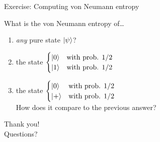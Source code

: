 \documentclass[10pt,aspectratio=169]{beamer}
\begin{document}
\begin{frame}{Exercise: Computing von Neumann entropy}
  \begin{exampleblock}{What is the von Neumann entropy of\dots}
    \begin{enumerate}[<+->]
      \item \emph{any} pure state $\ket{\psi}$?
      \item the state
        $\begin{cases}\ket{0} & \text{with prob. }1/2 \\ \ket{1} & \text{with prob. }1/2\end{cases}$
      \item the state
        $\begin{cases}\ket{0} & \text{with prob. }1/2 \\ \ket{+} & \text{with prob. }1/2\end{cases}$
        \\[0.4em]
        How does it compare to the previous answer?
    \end{enumerate}
  \end{exampleblock}
\end{frame}

\begin{frame}[plain]
  \centering
  \vfill
  {\Huge Thank you!}\\[0.6em]
  \large Questions?
  \vfill
\end{frame}
\end{document}
